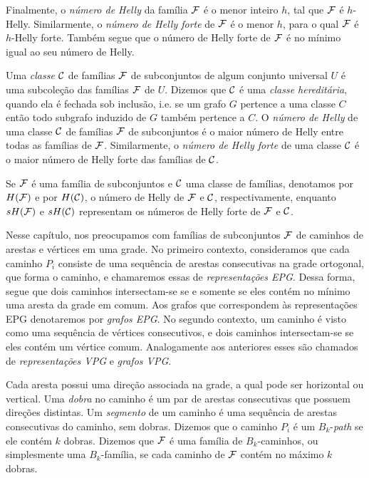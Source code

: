 Finalmente, o   {\it número de Helly} da família  $\cal{F}$ é o menor inteiro $h$, tal que $\cal{F}$ é  $h$-Helly. Similarmente, o {\it número de Helly forte} de  $\cal{F}$ é o menor $h$, para o qual  $\cal{F}$ é  $h$-Helly forte. Também segue que o número de Helly forte de $\cal{F}$ é no mínimo igual ao seu número de Helly.


Uma  {\it classe} $\cal {C}$ de famílias $\cal {F}$  de subconjuntos de algum conjunto universal $U$ é uma  subcoleção das famílias $\cal {F}$ de $U$. Dizemos que  $\cal C$ é uma {\it classe hereditária}, quando ela é fechada sob inclusão, i.e. se um grafo $G$ pertence a uma classe $C$ então todo subgrafo induzido de $G$ também pertence a $C$. O {\it número de Helly}  de uma classe  $\cal{C}$ de famílias $\cal{F}$ de subconjuntos é o maior número de Helly entre todas as famílias de $\cal {F}$. Similarmente, o {\it número de Helly forte} de uma classe  $\cal {C}$ é o maior número de Helly forte das famílias de $\cal {C}$.

Se $\cal F$ é uma família de subconjuntos e $\cal C$ uma classe de famílias, denotamos por $H(\cal F)$ e por 
$H(\cal C)$,  o número de  Helly de $\cal F$ e $\cal C$, respectivamente, enquanto  $sH({\cal F})$ e $sH({\cal C})$  representam os números de  Helly forte de $\cal F$ e $\cal C$.


Nesse capítulo, nos preocupamos com famílias de subconjuntos $\cal{F}$ de caminhos de arestas e vértices em uma grade. No primeiro contexto, consideramos que cada caminho $P_i$  consiste de uma sequência de arestas consecutivas na grade ortogonal, que forma o caminho, e chamaremos essas de   {\it representações EPG}. Dessa forma, segue que dois caminhos intersectam-se se e somente se eles contém no mínimo uma aresta da grade em comum. Aos grafos que  correspondem às representações EPG denotaremos por {\it grafos EPG}. 
No segundo contexto, um caminho é visto como uma sequência de vértices consecutivos, e dois caminhos intersectam-se se eles contém um vértice comum. Analogamente aos anteriores esses são chamados de {\it representações VPG} e {\it grafos VPG}. 

Cada aresta possui uma direção associada na grade, a qual pode ser horizontal ou vertical. Uma  {\it dobra} no caminho é um par de arestas consecutivas que possuem direções distintas.  Um {\it segmento} de um caminho é uma sequência de arestas consecutivas do caminho, sem dobras. Dizemos que o caminho $P_i$ é um  $B_k$-{\it path} se ele contém $k$ dobras. Dizemos que $\cal {F}$ é uma família de $B_k$-caminhos, ou simplesmente  uma $B_k$-família, se cada caminho de $\cal {F}$ contém no máximo $k$ dobras. 

